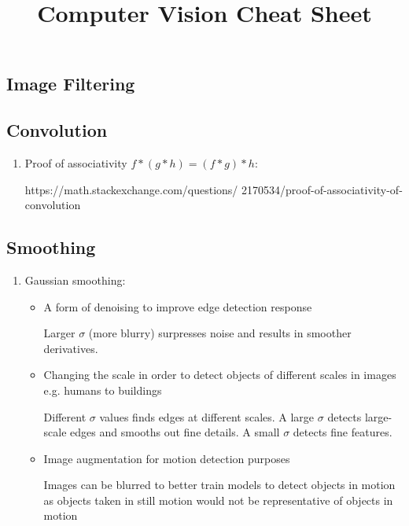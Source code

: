 \documentclass[9pt]{article}
\title{Computer Vision Cheat Sheet}
\begin{document}
\maketitle

\begin{multicols*}{2}
    \raggedcolumns

    \section{Image Filtering}
        \subsection{Convolution}
        \begin{enumerate}
            \item Proof of associativity $f \ast (g \ast h) = (f \ast g) \ast h$:
            
            https://math.stackexchange.com/questions/
            2170534/proof-of-associativity-of-convolution
        \end{enumerate}

        \subsection{Smoothing}
        \begin{enumerate}
            \item Gaussian smoothing:
            \begin{itemize}
                \item A form of denoising to improve edge detection response 
                
                Larger $\sigma$ (more blurry) surpresses noise and results in smoother derivatives. 


                \item Changing the scale in order to detect objects of different scales in images e.g. humans to buildings 
                
                Different $\sigma$ values finds edges at different scales. A large $\sigma$ detects large-scale edges and smooths out fine details. A small $\sigma$ detects fine features. 

                \item Image augmentation for motion detection purposes 
                
                Images can be blurred to better train models to detect objects in motion as objects taken in still motion would not be representative of objects in motion
            \end{itemize}
        \end{enumerate}


\end{multicols*}
\end{document}
